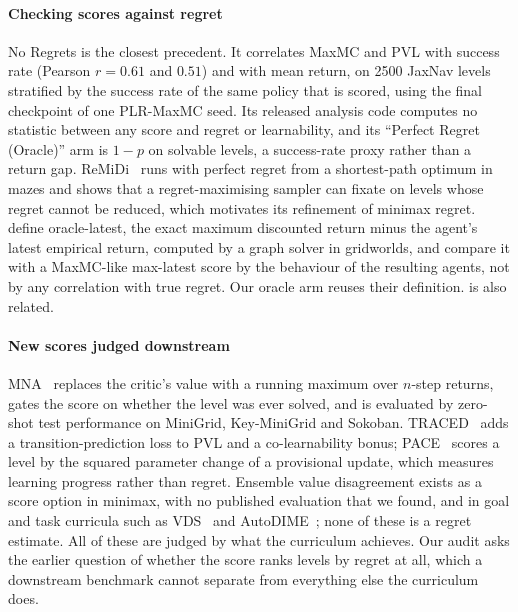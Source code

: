 \paragraph{Checking scores against regret} No Regrets is the closest precedent. It
correlates MaxMC and PVL with success rate (Pearson $r = 0.61$ and $0.51$) and with mean
return, on \num{2500} JaxNav levels stratified by the success rate of the same policy
that is scored, using the final checkpoint of one PLR-MaxMC seed.
Its released analysis code computes no statistic between any score and regret or
learnability, and its
``Perfect Regret (Oracle)'' arm is $1-p$ on solvable levels, a success-rate proxy rather
than a return gap.
ReMiDi~\citep{beukman2024remidi} runs \PLRp{} with perfect regret from a shortest-path
optimum in mazes and shows that a regret-maximising sampler can fixate on levels whose
regret cannot be reduced, which motivates its refinement of minimax regret.
\citet{abdelsadek2025goal} define oracle-latest, the exact maximum discounted return minus
the agent's latest empirical return, computed by a graph solver in gridworlds, and
compare it with a MaxMC-like max-latest score by the behaviour of the resulting agents,
not by any correlation with true regret.
Our oracle arm reuses their definition. \citet{monette2025} is also related.

\paragraph{New scores judged downstream} MNA~\citep{mead2026mna} replaces the critic's
value with a running maximum over $n$-step returns, gates the score on whether the level
was ever solved, and is evaluated by zero-shot test performance on MiniGrid, Key-MiniGrid
and Sokoban.
TRACED~\citep{cho2026traced} adds a transition-prediction loss to PVL and a
co-learnability bonus; PACE~\citep{yuan2026pace} scores a level by the squared parameter
change of a provisional update, which measures learning progress rather than regret.
Ensemble value disagreement exists as a score option in minimax, with no published
evaluation that we found, and in goal and task curricula such as
VDS~\citep{zhang2020vds} and AutoDIME~\citep{kanitscheider2022autodime}; none of these
is a regret estimate.
All of these are judged by what the curriculum achieves. Our audit asks the earlier
question of whether the score ranks levels by regret at all, which a downstream benchmark
cannot separate from everything else the curriculum does.

